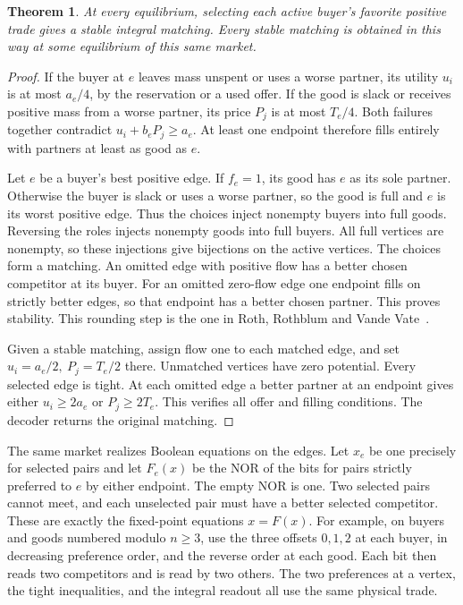 \documentclass[11pt,oneside,openany,notitlepage]{report}
\newtheorem{theorem}{Theorem}[chapter]
\begin{document}
\begin{theorem}\label{thm:ordinal}
At every equilibrium, selecting each active buyer's favorite positive
trade gives a stable integral matching. Every stable matching is obtained
in this way at some equilibrium of this same market.
\end{theorem}
\begin{proof}
If the buyer at \(e\) leaves mass unspent or uses a worse partner, its
utility \(u_i\) is at most \(a_e/4\), by the reservation or a used offer.
If the good is slack or receives positive mass from a worse partner,
its price \(P_j\) is at most \(T_e/4\). Both failures together contradict
\(u_i+b_eP_j\ge a_e\). At least one endpoint therefore fills entirely
with partners at least as good as \(e\).

Let \(e\) be a buyer's best positive edge. If \(f_e=1\), its good
has \(e\) as its sole partner. Otherwise the buyer is slack or uses a
worse partner, so the good is full and \(e\) is its worst positive
edge. Thus the choices inject nonempty buyers into full goods. Reversing
the roles injects nonempty goods into full buyers. All full vertices
are nonempty, so these injections give bijections on the active vertices.
The choices form a matching. An omitted edge with positive flow has a
better chosen competitor at its buyer. For an omitted zero-flow edge
one endpoint fills on strictly better edges, so that endpoint has a
better chosen partner. This proves stability. This rounding step is the
one in Roth, Rothblum and Vande Vate~\cite[Lemma~12]{rrvv}.

Given a stable matching, assign flow one to each matched edge, and
set \(u_i=a_e/2,\ P_j=T_e/2\) there. Unmatched vertices have zero
potential. Every selected edge is tight. At each omitted edge a better
partner at an endpoint gives either \(u_i\ge2a_e\) or \(P_j\ge2T_e\).
This verifies all offer and filling conditions. The decoder returns the
original matching.
\end{proof}

The same market realizes Boolean equations on the edges. Let \(x_e\)
be one precisely for selected pairs and let \(F_e(x)\) be the NOR of
the bits for pairs strictly preferred to \(e\) by either endpoint.
The empty NOR is one. Two selected pairs cannot meet, and each
unselected pair must have a better selected competitor. These are
exactly the fixed-point equations \(x=F(x)\). For example, on buyers
and goods numbered modulo \(n\ge3\), use the three offsets \(0,1,2\)
at each buyer, in decreasing preference order, and the reverse order
at each good. Each bit then reads two competitors and is read by two
others. The two preferences at a vertex, the tight inequalities, and
the integral readout all use the same physical trade.
\end{document}
